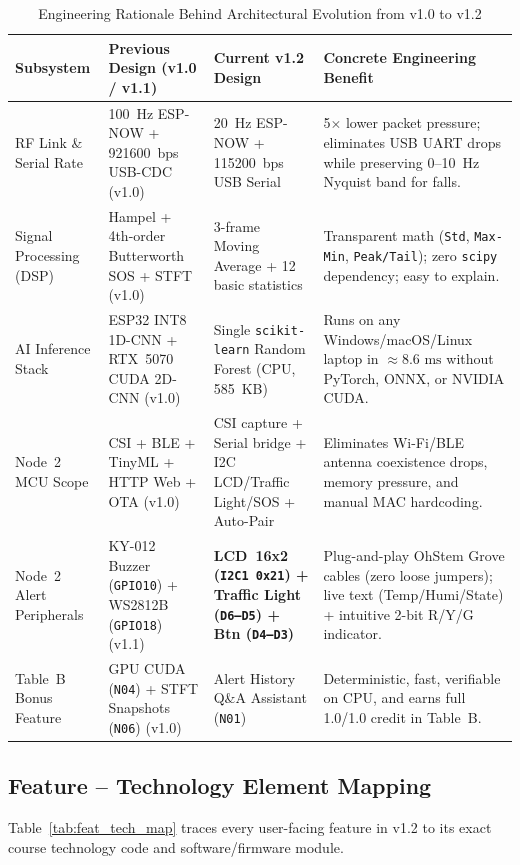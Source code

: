 \documentclass{hcmut-report}
\begin{document}
\begin{table}[H]
\centering
\caption{Engineering Rationale Behind Architectural Evolution from v1.0 to v1.2}
\label{tab:streamlining_rationale}
\footnotesize
\begin{tabularx}{\textwidth}{|P{2.7cm}|P{3.6cm}|P{3.8cm}|Y|}
\hline
\textbf{Subsystem} & \textbf{Previous Design (v1.0 / v1.1)} & \textbf{Current v1.2 Design} & \textbf{Concrete Engineering Benefit} \\
\hline
RF Link \& Serial Rate & 100~Hz ESP-NOW + 921600~bps USB-CDC (v1.0) & 20~Hz ESP-NOW + 115200~bps USB Serial & 5$\times$ lower packet pressure; eliminates USB UART drops while preserving 0--10~Hz Nyquist band for falls. \\
\hline
Signal Processing (DSP) & Hampel + 4th-order Butterworth SOS + STFT (v1.0) & 3-frame Moving Average + 12 basic statistics & Transparent math (\texttt{Std}, \texttt{Max-Min}, \texttt{Peak/Tail}); zero \texttt{scipy} dependency; easy to explain. \\
\hline
AI Inference Stack & ESP32 INT8 1D-CNN + RTX~5070 CUDA 2D-CNN (v1.0) & Single \texttt{scikit-learn} Random Forest (CPU, 585~KB) & Runs on any Windows/macOS/Linux laptop in $\approx 8.6\text{ ms}$ without PyTorch, ONNX, or NVIDIA CUDA. \\
\hline
Node~2 MCU Scope & CSI + BLE + TinyML + HTTP Web + OTA (v1.0) & CSI capture + Serial bridge + I2C LCD/Traffic Light/SOS + Auto-Pair & Eliminates Wi-Fi/BLE antenna coexistence drops, memory pressure, and manual MAC hardcoding. \\
\hline
Node~2 Alert Peripherals & KY-012 Buzzer (\texttt{GPIO10}) + WS2812B (\texttt{GPIO18}) (v1.1) & \textbf{LCD~16x2 (\texttt{I2C1 0x21}) + Traffic Light (\texttt{D6--D5}) + Btn (\texttt{D4--D3})} & Plug-and-play OhStem Grove cables (zero loose jumpers); live text (Temp/Humi/State) + intuitive 2-bit R/Y/G indicator. \\
\hline
Table~B Bonus Feature & GPU CUDA (\texttt{N04}) + STFT Snapshots (\texttt{N06}) (v1.0) & Alert History Q\&A Assistant (\texttt{N01}) & Deterministic, fast, verifiable on CPU, and earns full 1.0/1.0 credit in Table~B. \\
\hline
\end{tabularx}
\end{table}

\subsection{Feature -- Technology Element Mapping}
Table~\ref{tab:feat_tech_map} traces every user-facing feature in v1.2 to its exact course technology code and software/firmware module.
\end{document}
